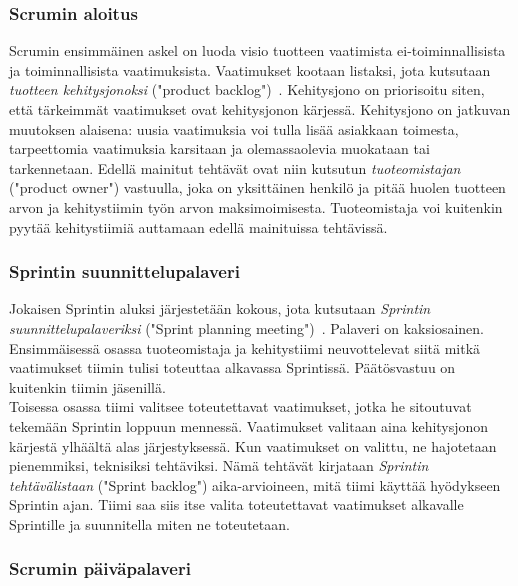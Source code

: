 \documentclass[finnish]{../tktltiki2}
\theoremstyle{definition}
\theoremstyle{remark}
\begin{document}
\subsubsection{Scrumin aloitus}

Scrumin ensimmäinen askel on luoda visio tuotteen vaatimista
ei-toiminnalli\-sista ja toiminnallisista vaatimuksista. Vaatimukset
kootaan listaksi, jota kutsutaan \emph{tuotteen kehitysjonoksi} ("product backlog")~\cite{ScrumFinnishGuide}. Kehitysjono on priorisoitu siten, että tärkeimmät vaatimukset ovat kehitysjonon kärjessä. Kehitysjono on jatkuvan muutoksen alaisena: uusia vaatimuksia
voi tulla lisää asiakkaan toimesta, tarpeettomia vaatimuksia karsitaan ja olemassaolevia muokataan tai tarkennetaan. Edellä mainitut tehtävät
ovat niin kutsutun \emph{tuoteomistajan} ("product owner") vastuulla,
joka on yksittäinen henkilö ja pitää huolen tuotteen arvon ja kehitystiimin työn arvon maksimoimisesta. Tuoteomistaja voi kuitenkin pyytää kehitystiimiä auttamaan edellä mainituissa tehtävissä.

\subsubsection{Sprintin suunnittelupalaveri}

Jokaisen Sprintin aluksi järjestetään kokous, jota kutsutaan \emph{Sprintin suunnittelupalaveriksi} ("Sprint planning meeting")~\cite{ScrumHandBook}. Palaveri on kaksiosainen.
Ensimmäisessä osassa tuoteomistaja ja kehitystiimi neuvottelevat
siitä mitkä vaatimukset tiimin tulisi toteuttaa alkavassa
Sprintissä. Päätösvastuu on kuitenkin tiimin jäsenillä.\\

Toisessa osassa tiimi valitsee toteutettavat vaatimukset, jotka
he sitoutuvat tekemään Sprintin loppuun mennessä. Vaatimukset
valitaan aina kehitysjonon kärjestä ylhäältä alas järjestyksessä.
Kun vaatimukset on valittu, ne hajotetaan pienemmiksi, teknisiksi
tehtäviksi. Nämä tehtävät kirjataan \emph{Sprintin tehtävälistaan} ("Sprint backlog") aika-arvioineen, mitä tiimi käyttää hyödykseen Sprintin ajan. Tiimi saa siis itse valita toteutettavat vaatimukset alkavalle Sprintille ja suunnitella miten ne toteutetaan.

\subsubsection{Scrumin päiväpalaveri}
\end{document}
